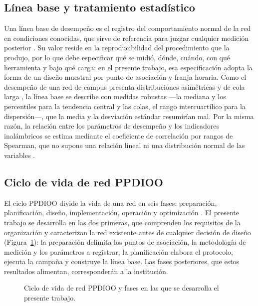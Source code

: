 \subsection{Línea base y tratamiento estadístico}

Una línea base de desempeño es el registro del comportamiento normal de la red en condiciones conocidas, que sirve de referencia para juzgar cualquier medición posterior \cite{oppenheimer2011topdown}. Su valor reside en la reproducibilidad del procedimiento que la produjo, por lo que debe especificar qué se midió, dónde, cuándo, con qué herramienta y bajo qué carga; en el presente trabajo, esa especificación adopta la forma de un diseño muestral por punto de asociación y franja horaria. Como el desempeño de una red de campus presenta distribuciones asimétricas y de cola larga \cite{sui2016wifiseer}, la línea base se describe con medidas robustas ---la mediana y los percentiles para la tendencia central y las colas, el rango intercuartílico para la dispersión---, que la media y la desviación estándar resumirían mal. Por la misma razón, la relación entre los parámetros de desempeño y los indicadores inalámbricos se estima mediante el coeficiente de correlación por rangos de Spearman, que no supone una relación lineal ni una distribución normal de las variables \cite{hollander2014nonparametric}.

\subsection{Ciclo de vida de red PPDIOO}

El ciclo PPDIOO divide la vida de una red en seis fases: preparación, planificación, diseño, implementación, operación y optimización \cite{oppenheimer2011topdown}. El presente trabajo se desarrolla en las dos primeras, que comprenden los requisitos de la organización y caracterizan la red existente antes de cualquier decisión de diseño (Figura~\ref{fig:ppdioo}): la preparación delimita los puntos de asociación, la metodología de medición y los parámetros a registrar; la planificación elabora el protocolo, ejecuta la campaña y construye la línea base. Las fases posteriores, que estos resultados alimentan, corresponderán a la institución.

\begin{figure}[htbp]
  \centering
  
  \caption{Ciclo de vida de red PPDIOO y fases en las que se desarrolla el presente trabajo.}
  \label{fig:ppdioo}
  \raggedright
\end{figure}

